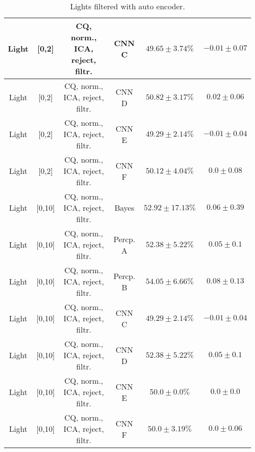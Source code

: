 \begin{table}[!htb]
{\begin{tabular}{c|c|c|c|c|c}
    \hline
    Light               & [0,2]                                & \scriptsize{CQ, norm., ICA, reject, filtr.}& CNN C                 &  $49.65 \pm 3.74\%$   & $-0.01 \pm 0.07$\\  
    \hline
    Light               & [0,2]                                & \scriptsize{CQ, norm., ICA, reject, filtr.}& CNN D                 &  $50.82 \pm 3.17\%$   & $0.02 \pm 0.06$\\  
    \hline
    Light               & [0,2]                                & \scriptsize{CQ, norm., ICA, reject, filtr.}& CNN E                 &  $49.29 \pm 2.14\%$   & $-0.01 \pm 0.04$\\  
    \hline
    Light               & [0,2]                                & \scriptsize{CQ, norm., ICA, reject, filtr.}& CNN F                 &  $50.12 \pm 4.04\%$   & $0.0 \pm 0.08$\\   
    \hline
    Light               & [0,10]                               & \scriptsize{CQ, norm., ICA, reject, filtr.}& Bayes                 &  $52.92 \pm 17.13\%$  & $0.06 \pm 0.39$\\  
    \hline
    Light               & [0,10]                               & \scriptsize{CQ, norm., ICA, reject, filtr.}& Percp. A              &  $52.38 \pm 5.22\%$   & $0.05 \pm 0.1$\\   
    \hline
    Light               & [0,10]                               & \scriptsize{CQ, norm., ICA, reject, filtr.}& Percp. B              &  $54.05 \pm 6.66\%$   & $0.08 \pm 0.13$\\  
    \hline
    Light               & [0,10]                               & \scriptsize{CQ, norm., ICA, reject, filtr.}& CNN C                 &  $49.29 \pm 2.14\%$   & $-0.01 \pm 0.04$\\ 
    \hline
    Light               & [0,10]                               & \scriptsize{CQ, norm., ICA, reject, filtr.}& CNN D                 &  $52.38 \pm 5.22\%$   & $0.05 \pm 0.1$\\   
    \hline
    Light               & [0,10]                               & \scriptsize{CQ, norm., ICA, reject, filtr.}& CNN E                 &  $50.0 \pm 0.0\%$     & $0.0 \pm 0.0$\\    
    \hline
    Light               & [0,10]                               & \scriptsize{CQ, norm., ICA, reject, filtr.}& CNN F                 &  $50.0 \pm 3.19\%$    & $0.0 \pm 0.06$\\  
    \hline
\end{tabular}
}
\caption{Lights filtered with auto encoder.}
\label{tab:lights-filtered+reject-app}
\end{table}